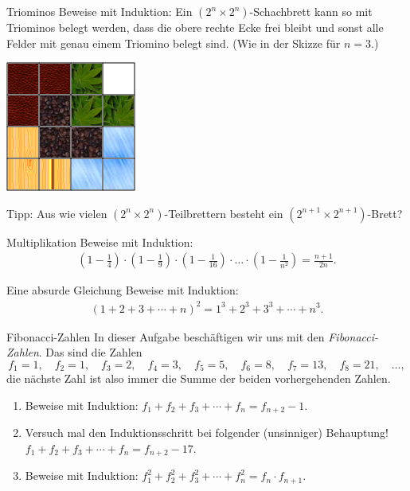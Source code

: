 \documentclass{../zirkelblatt1415}
\begin{document}
 \begin{aufgabe}{Triominos}
Beweise mit Induktion: Ein $(2^n \times 2^n)$-Schachbrett kann so mit Triominos belegt werden, dass die obere rechte Ecke frei bleibt 
und sonst alle Felder mit genau einem Triomino belegt sind. (Wie in der Skizze f\"ur $n=3$.)

\begin{center}
 \includegraphics[scale=1]{triominos.png}
\end{center}

\noindent Tipp: Aus wie vielen $(2^n \times 2^n)$-Teilbrettern besteht ein $(2^{n+1} \times 2^{n+1})$-Brett?
 \end{aufgabe}

\begin{aufgabe}{Multiplikation}
Beweise mit Induktion: 
\begin{align*}
\left(1 - \frac{1}{4}\right) \cdot \left(1 - \frac{1}{9}\right) \cdot \left(1 -
\frac{1}{16}\right) \cdot \ldots \cdot \left(1 - \frac{1}{n^2}\right) = \frac{n+1}{2n}.
\end{align*}
\vspace{-1em}
\end{aufgabe}

\begin{aufgabe}{Eine absurde Gleichung}
Beweise mit Induktion:
\begin{align*}
(1 + 2 + 3 + \cdots + n)^2 = 1^3 + 2^3 + 3^3 + \cdots + n^3.
\end{align*}
\vspace{-2em}
\end{aufgabe}

\enlargethispage{2.5em}

\begin{aufgabe}{Fibonacci-Zahlen}
In dieser Aufgabe besch\"aftigen wir uns mit den \emph{Fibonacci-Zahlen}.
Das sind die Zahlen
\[ f_1 = 1, \quad f_2 = 1, \quad f_3 = 2, \quad f_4 = 3, \quad f_5 = 5,
\quad f_6 = 8, \quad f_7 = 13, \quad f_8 = 21, \quad \ldots, \]
die n\"achste Zahl ist also immer die Summe der beiden vorhergehenden
Zahlen.
\begin{enumerate}
\item Beweise mit Induktion:
$f_1 + f_2 + f_3 + \cdots + f_n = f_{n+2} - 1$.
\item Versuch mal den Induktionsschritt bei folgender (unsinniger) Behauptung! \\
$f_1 + f_2 + f_3 + \cdots + f_n = f_{n+2} - 17$.
\item Beweise mit Induktion:
$f_1^2 + f_2^2 + f_3^2 + \cdots + f_n^2 = f_n \cdot f_{n+1}$.
\end{enumerate}\fixlistspacing
\end{aufgabe}
\end{document}
